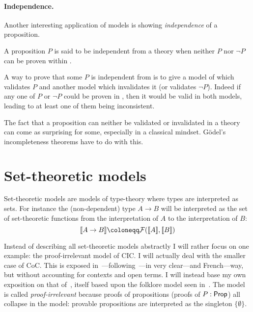 \paragraph{Independence.}

Another interesting application of models is showing \emph{independence} of a
proposition.

\begin{definition}
  A proposition \(P\) is said to be independent from a theory \cT when neither
  \(P\) nor \(\neg P\) can be proven within \cT.
\end{definition}

A way to prove that some \(P\) is independent from \cT is to give a model of \cT
which validates \(P\) and another model which invalidates it (or validates
\(\neg P\)). Indeed if any one of \(P\) or \(\neg P\) %
could be proven in \cT, then it would be valid in both models, leading to
at least one of them being inconsistent.

The fact that a proposition can neither be validated or invalidated in a theory
can come as surprising for some, especially in a classical mindset.
Gödel's incompleteness theorems have to do with this.

\section{Set-theoretic models}

Set-theoretic models are models of type-theory where types are interpreted as
sets. For instance the (non-dependent) type \(A \to B\) will be interpreted as
the set of set-theoretic functions from the interpretation of \(A\) to the
interpretation of \(B\):
\[
  \transl{A \to B} \coloneqq \setfun{\transl{A}}{\transl{B}}
\]

Instead of describing all set-theoretic models abstractly I will rather focus on
one example: the proof-irrelevant model of \acrshort{CIC}. I will actually deal
with the smaller case of \acrshort{CoC}.
This is exposed
in~---following~---in very clear---and French---way,
but without accounting for contexts and open terms.
I will instead base my own exposition on that of~,
itself based upon the folklore model seen
in~.
The model is called \emph{proof-irrelevant} because proofs of propositions
(proofs of \(P : \mathsf{Prop}\)) all collapse in the model: provable propositions
are interpreted as the singleton \(\{ \emptyset \}\).


